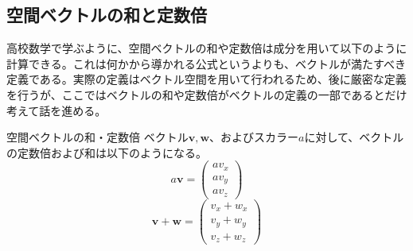 \subsection{空間ベクトルの和と定数倍}
高校数学で学ぶように、空間ベクトルの和や定数倍は成分を用いて以下のように計算できる。これは何かから導かれる公式というよりも、ベクトルが満たすべき定義である。実際の定義はベクトル空間を用いて行われるため、後に厳密な定義を行うが、ここではベクトルの和や定数倍がベクトルの定義の一部であるとだけ考えて話を進める。
\begin{definition*}{空間ベクトルの和・定数倍}
	ベクトル\(\boldsymbol{v},\boldsymbol{w}\)、およびスカラー\(a\)に対して、ベクトルの定数倍および和は以下のようになる。
	\begin{equation}
		a\boldsymbol{v}= \begin{pmatrix} av_x \\av_y \\ av_z \end{pmatrix}
	\end{equation}
	\begin{equation}
		\boldsymbol{v}+\boldsymbol{w}= \begin{pmatrix} v_x+w_x \\v_y+w_y \\ v_z+w_z \end{pmatrix}
	\end{equation}
\end{definition*}

